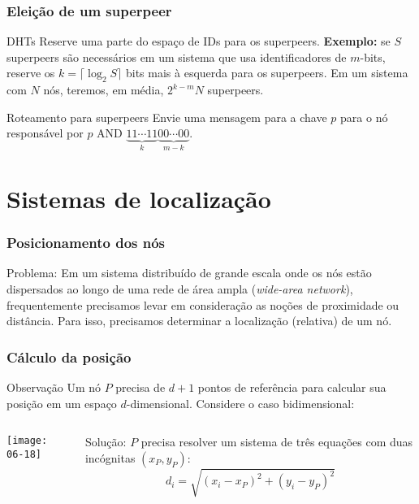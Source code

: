 \documentclass[Ligatures=TeX,table,brazil,svgnames,usetotalslideindicator,compress,10pt]{beamer}
\begin{document}
\begin{frame}
  \frametitle{Eleição de um superpeer}

  \begin{block}{DHTs}
    Reserve uma parte do espaço de IDs para os superpeers. \textbf{Exemplo:} se $S$ superpeers são necessários em um sistema que usa identificadores de $m$-bits, reserve os $k = \lceil \log_2 S \rceil$ bits mais à esquerda para os superpeers. Em um sistema com $N$ nós, teremos, em média, $2^{k-m}N$ superpeers.
  \end{block}

  \begin{block}{Roteamento para superpeers}
    Envie uma mensagem para a chave $p$ para o nó responsável por $p \mbox{\ AND\ } \underbrace{11 \cdots 11}_k \underbrace{00 \cdots 00}_{m-k}$.
  \end{block}
\end{frame}

\section{Sistemas de localização}

\begin{frame}
  \frametitle{Posicionamento dos nós}
  \begin{block}{Problema:}
    Em um sistema distribuído de grande escala onde os nós estão
    dispersados ao longo de uma rede de área ampla (\textit{wide-area
      network}), frequentemente precisamos levar em consideração as
    noções de \alert{proximidade} ou \alert{distância}. Para isso,
    precisamos determinar a \alert{localização} (relativa) de um nó.
  \end{block}

\end{frame}

\begin{frame}
  \frametitle{Cálculo da posição}
  \begin{block}{Observação}
    Um nó $P$ precisa de $d+1$ pontos de referência para calcular sua posição em um espaço $d$-dimensional. Considere o caso bidimensional:
  \end{block}
  \begin{columns}
    \begin{column}{.4\textwidth}
      \texttt{[image: 06-18]}
    \end{column}
    \quad
    \begin{column}{.4\textwidth}
      \begin{block}{Solução:}
        $P$ precisa resolver um sistema de três equações com duas incógnitas $(x_P,y_P)$:
        \[ d_i = \sqrt{(x_i-x_P)^2+(y_i-y_P)^2} \]
      \end{block}
    \end{column}
  \end{columns}
\end{frame}
\end{document}
